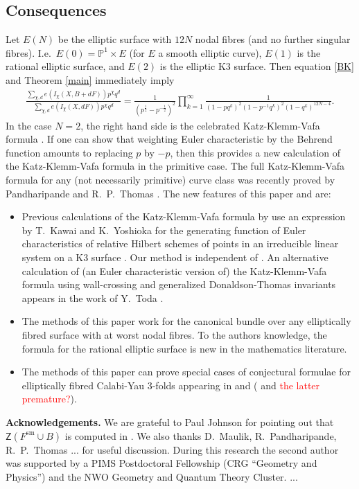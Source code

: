 \documentclass{amsart}
\theoremstyle{definition}
\newcommand{\PP} {\mathbb{P}}
\newcommand{\sm}{\mathrm{sm}}
\newcommand{\sfZ} {\mathsf{Z}}
\begin{document}
\subsection{Consequences} Let $E(N)$ be the elliptic surface with $12N$ nodal fibres (and no further singular fibres). I.e.~$E(0) = \PP^1 \times E$ (for $E$ a smooth elliptic curve), $E(1)$ is the rational elliptic surface, and $E(2)$ is the elliptic K3 surface. Then equation \eqref{BK} and Theorem \ref{main} immediately imply 
\begin{align*} 
\frac{\sum_{\chi, d} e(I_\chi(X,B+dF)) p^\chi q^d}{\sum_{\chi, d} e(I_\chi(X,dF)) p^\chi q^d} = \frac{1}{(p^{\frac{1}{2}}-p^{-\frac{1}{2}})^2} \prod_{k=1}^{\infty} \frac{1}{(1-p q^k)^2 (1-p^{-1} q^k)^2 (1-q^k)^{12N-4}}.
\end{align*}
In the case $N=2$, the right hand side is the celebrated Katz-Klemm-Vafa formula \cite{KKV}. If one can show that weighting Euler characteristic by the Behrend function amounts to replacing $p$ by $-p$, then this provides a new calculation of the Katz-Klemm-Vafa formula in the primitive case. 
The full Katz-Klemm-Vafa formula for any (not necessarily primitive) curve class was recently proved by Pandharipande and R.~P.~Thomas \cite{PT}. The new features of this paper and \cite{BK} are:
\begin{itemize}
\item Previous calculations of the Katz-Klemm-Vafa formula by \cite{MPT, PT} use an expression by T.~Kawai and K.~Yoshioka for the generating function of Euler characteristics of relative Hilbert schemes of points in an irreducible linear system on a K3 surface \cite{KY}. Our method is independent of \cite{KY}. An alternative calculation of (an Euler characteristic version of) the Katz-Klemm-Vafa formula using wall-crossing and generalized Donaldson-Thomas invariants appears in the work of Y.~Toda \cite{Tod}.
\item The methods of this paper work for the canonical bundle over any elliptically fibred  surface with at worst nodal fibres. To the authors knowledge, the formula for the rational elliptic surface is new in the mathematics literature.
\item The methods of this paper can prove special cases of conjectural formulae for elliptically fibred Calabi-Yau 3-folds appearing in \cite{OPa} and \cite{HKK} (\cite{BOP} and \cite{BGK} \textcolor{red}{the latter premature?}).
\end{itemize}

\noindent \textbf{Acknowledgements.} We are grateful to Paul Johnson for pointing out that $\sfZ(F^{\sm} \cup B)$ is computed in \cite{BO}. We also thanks D.~Maulik, R.~Pandharipande, R.~P.~Thomas ... for useful discussion. During this research the second author was supported by a PIMS Postdoctoral Fellowship (CRG ``Geometry and Physics'') and the NWO Geometry and Quantum Theory Cluster. ...
\end{document}
